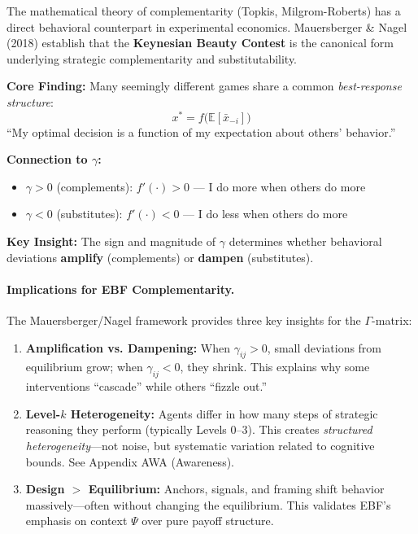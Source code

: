 The mathematical theory of complementarity (Topkis, Milgrom-Roberts) has a direct
behavioral counterpart in experimental economics. Mauersberger \& Nagel (2018)
establish that the \textbf{Keynesian Beauty Contest} is the canonical form underlying
strategic complementarity and substitutability.

\begin{tcolorbox}[colback=yellow!5!white, colframe=yellow!75!black,
    title=\textbf{Mauersberger \& Nagel (2018): Strategic Complementarity in Action}]

\textbf{Core Finding:}
Many seemingly different games share a common \textit{best-response structure}:
\[
x^* = f\bigl(\mathbb{E}[\bar{x}_{-i}]\bigr)
\]
``My optimal decision is a function of my expectation about others' behavior.''

\textbf{Connection to $\gamma$:}
\begin{itemize}[nosep]
    \item $\gamma > 0$ (complements): $f'(\cdot) > 0$ --- I do more when others do more
    \item $\gamma < 0$ (substitutes): $f'(\cdot) < 0$ --- I do less when others do more
\end{itemize}

\textbf{Key Insight:} The sign and magnitude of $\gamma$ determines whether
behavioral deviations \textbf{amplify} (complements) or \textbf{dampen} (substitutes).

\end{tcolorbox}

\paragraph{Implications for EBF Complementarity.}
The Mauersberger/Nagel framework provides three key insights for the $\Gamma$-matrix:

\begin{enumerate}[nosep]
    \item \textbf{Amplification vs. Dampening:} When $\gamma_{ij} > 0$, small deviations
    from equilibrium grow; when $\gamma_{ij} < 0$, they shrink. This explains why
    some interventions ``cascade'' while others ``fizzle out.''

    \item \textbf{Level-$k$ Heterogeneity:} Agents differ in how many steps of
    strategic reasoning they perform (typically Levels 0--3). This creates
    \textit{structured heterogeneity}---not noise, but systematic variation
    related to cognitive bounds. See Appendix AWA (Awareness).

    \item \textbf{Design $>$ Equilibrium:} Anchors, signals, and framing shift
    behavior massively---often without changing the equilibrium. This validates
    EBF's emphasis on context $\Psi$ over pure payoff structure.
\end{enumerate}

